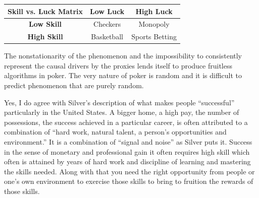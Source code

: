 \documentclass[12pt]{article}
\begin{document}
\begin{enumerate}

\begin{tcolorbox}[colback=white, sharp corners]
\begin{center}
\begin{tabular}{|c|c|c|}
\hline
 \textbf{Skill vs. Luck Matrix} & \textbf{Low Luck} & \textbf{High Luck}\\
 \hline
 \textbf{Low Skill} & Checkers & Monopoly  \\
 \hline
 \textbf{High Skill} & Basketball  &  Sports Betting \\
 \hline
\end{tabular}
\end{center}
\end{tcolorbox}



\begin{tcolorbox}[colback=white, sharp corners]
The nonstationarity of the phenomenon and the impossibility to consistently represent the causal drivers by the proxies lends itself to produce fruitless algorithms in poker. The very nature of poker is random and it is difficult to predict phenomenon that are purely random. 
\end{tcolorbox}



\begin{tcolorbox}[colback=white, sharp corners]
Yes, I do agree with Silver's description of what makes people ``successful'' particularly in the United States. A bigger home, a high pay, the number of possessions, the success achieved in a particular career, is often attributed to a combination of ``hard work, natural talent, a person's opportunities and environment.'' It is a combination of ``signal and noise'' as Silver puts it. Success in the sense of monetary and professional gain it often requires high skill which often is attained by years of hard work and discipline of learning and mastering the skills needed. Along with that you need the right opportunity from people or one's own environment to exercise those skills to bring to fruition the rewards of those skills. 
\end{tcolorbox}



\end{enumerate}
\end{document}
